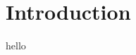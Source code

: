 \documentclass[main.tex]{subfiles}
\begin{document}
\section{Introduction}\label{sec:introduction}

hello 
\end{document}
